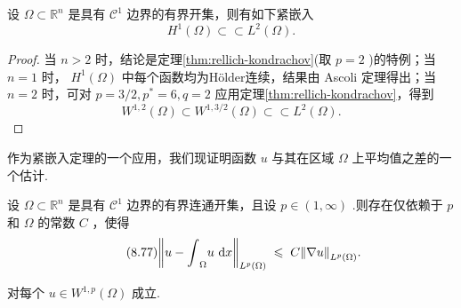 \begin{corollary}\label{cor:H1-L2-compact-embedding}
设 $\Omega  \subset  {\mathbb{R}}^{n}$ 是具有 ${\mathcal{C}}^{1}$ 边界的有界开集，则有如下紧嵌入
\[
{H}^{1}\left( \Omega \right)  \subset  \subset  {L}^{2}\left( \Omega \right) .
\]
\end{corollary}

\begin{proof}
当 $n > 2$ 时，结论是定理\ref{thm:rellich-kondrachov}(取 $p = 2$ )的特例；当 $n = 1$ 时， ${H}^{1}\left( \Omega \right)$ 中每个函数均为Hölder连续，结果由 Ascoli 定理得出；当 $n = 2$ 时，可对 $p = 3/2,{p}^{ * } = 6,q = 2$ 应用定理\ref{thm:rellich-kondrachov}，得到
\[
{W}^{1,2}\left( \Omega \right)  \subset  {W}^{1,3/2}\left( \Omega \right)  \subset  \subset  {L}^{2}\left( \Omega \right) .
\]
\end{proof}

作为紧嵌入定理的一个应用，我们现证明函数 $u$ 与其在区域 $\Omega$ 上平均值之差的一个估计.

\begin{theorem}\label{thm:poincare-inequality-ii}
设 $\Omega  \subset  {\mathbb{R}}^{n}$ 是具有 ${\mathcal{C}}^{1}$ 边界的有界连通开集，且设 $p \in  \left(  {1,\infty }\right)$ .则存在仅依赖于 $p$ 和 $\Omega$ 的常数 $C$ ，使得
\begin{equation}\tag{8.77}\label{eq:poincare-ii}
\norm{u - {\int }_{\Omega }u\,\mathop{}\!\mathrm{d} x}_{{L}^{p}\left( \Omega \right) }\; \leqslant  \;C\norm{\nabla u}_{{L}^{p}\left( \Omega \right) }.
\end{equation}

对每个 $u \in  {W}^{1,p}\left( \Omega \right)$ 成立.
\end{theorem}

